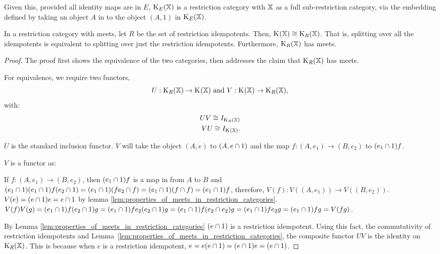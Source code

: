 Given this, provided all identity maps are in $E$, $\text{K}_{E}(\mathbb{X})$ is a
restriction category with $\mathbb{X}$ as a full sub-restriction category, via
the embedding defined by taking an object $A$ in \X to  the object $(A,1)$
in $\text{K}_{E}(\mathbb{X})$.


\begin{proposition}\label{pro:in_rc_x_with_meets_split_x_is_cong_to_split_r_x}
  In a restriction category \X with meets, let $R$ be the set of restriction idempotents.
  Then, $\text{K}_{}(\mathbb{X}) \cong \text{K}_{R}(\mathbb{X})$. That is, splitting over all the idempotents is equivalent to
  splitting over just the restriction idempotents.
  Furthermore, $\text{K}_{R}(\mathbb{X})$ has meets.
\end{proposition}
\begin{proof}
  The proof first shows the equivalence of the two categories, then addresses the claim
  that $\text{K}_{R}(\mathbb{X})$ has meets.

  For equivalence, we require two functors,
  \[
    U:\text{K}_{R}(\mathbb{X})\to\text{K}_{}(\mathbb{X})\text{ and }V:\text{K}_{}(\mathbb{X})\to\text{K}_{R}(\mathbb{X}),
  \]
  with:
  \begin{align}
    U V \cong I_{\text{K}_{R}(\mathbb{X})}\\
    V U \cong I_{\text{K}_{}(\mathbb{X})}.
  \end{align}


  $U$ is the standard inclusion functor. $V$ will take the object $(A,e)$ to
  $(A,e\cap 1)$ and the map $f:(A,e_1)\to (B,e_2)$ to $(e_1\cap 1)f $.

  $V$ is a functor as:
  \begin{description}
     If  $f:(A,e_1) \to (B,e_2)$, then
      $(e_1\cap 1) f $ is a map in \X from $A$ to $B$ and
      $ (e_1\cap 1)(e_1\cap 1) f  (e_2 \cap 1) =
      (e_1\cap 1) (f  e_2 \cap f ) = (e_1\cap 1) (f \cap f)= (e_1\cap 1) f$, therefore,
      $V(f):V((A,e_1)) \to V((B,e_2))$.
     $V(e) = (e\cap 1 ) e = e \cap 1$ by
      lemma \ref{lem:properties_of_meets_in_restriction_categories}.
     $V(f) V(g)
      = (e_1\cap 1 ) f (e_2 \cap 1) g
      = (e_1\cap 1 ) f e_2 (e_2 \cap 1) g
      = (e_1\cap 1 ) f  (e_2 \cap e_{2}) g
      = (e_1\cap 1 ) f e_2 g
      = (e_1\cap 1 ) f g
      = V(f g)$.
  \end{description}

  By Lemma \ref{lem:properties_of_meets_in_restriction_categories} $(e\cap 1)$
  is a restriction idempotent. Using this fact, the commutativity of restriction idempotents
  and Lemma~\ref{lem:properties_of_meets_in_restriction_categories}, the composite functor $U V$ is
  the identity on $\text{K}_{R}(\mathbb{X})$. This is because when $e$ is a restriction idempotent,
  $e = e (e\cap 1) = (e\cap 1) e = (e\cap 1)$.


\end{proof}
